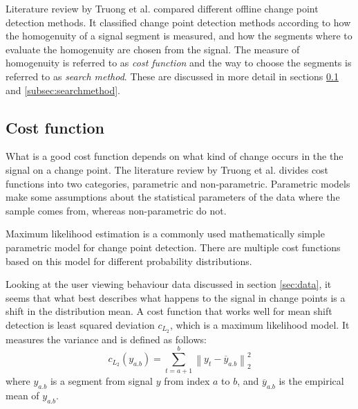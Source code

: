 Literature review by Truong et al. \cite{truongSelectiveReviewOffline2020} compared different offline change point detection methods. It classified change point detection methods according to how the homogenuity of a signal segment is measured, and how the segments where to evaluate the homogenuity are chosen from the signal. The measure of homogenuity is referred to as \textit{cost function} and the way to choose the segments is referred to as \textit{search method}. These are discussed in more detail in sections \ref{subsec:costfunction} and \ref{subsec:searchmethod}.


\subsection{Cost function} \label{subsec:costfunction}


What is a good cost function depends on what kind of change occurs in the the signal on a change point. The literature review by Truong et al. \cite{truongSelectiveReviewOffline2020} divides cost functions into two categories, parametric and non-parametric. Parametric models make some assumptions about the statistical parameters of the data where the sample comes from, whereas non-parametric do not.

Maximum likelihood estimation is a commonly used mathematically simple parametric model for change point detection. %
There are multiple cost functions based on this model for different probability distributions.

Looking at the user viewing behaviour data discussed in section \ref{sec:data}, it seems that what best describes what happens to the signal in change points is a shift in the distribution mean. A cost function that works well for mean shift detection is least squared deviation $c_{L_2}$, which is a maximum likelihood model. It measures the variance and is defined as follows:
\begin{equation} %
    c_{L_2}(y_{a.b}) = \sum^b_{t=a+1} \left\lVert y_t-\overline{y}_{a.b} \right\rVert ^2_2
    \label{eq:l2}
\end{equation}
where $y_{a.b}$ is a segment from signal $y$ from index $a$ to $b$, and  $\overline{y}_{a.b}$ is the empirical mean of $y_{a.b}$.

